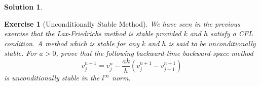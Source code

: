 \documentclass[10pt,letterpaper]{article}
\newcommand{\rb}[1]{ \left(  {#1} \right) }
\newcommand{\frb}[1]{ \left(  {#1} \right) }
\theoremstyle{break}
\newtheorem{exercise}{Exercise}
\newtheorem{mysolution}{Solution}
\newenvironment{solution}{\begin{mysolution}}{\end{mysolution}}
\begin{document}
\begin{solution}
\end{solution}













\begin{exercise}[Unconditionally Stable Method]
	We have seen in the previous exercise that the Lax-Friedrichs
	method is stable provided $k$ and $h$ satisfy a CFL condition.
	A method which is stable for any $k$ and $h$ is said to be
	\textit{unconditionally stable}.
	For $a>0$, prove that the following backward-time backward-space method
	$$
		v_{j}^{n+1}=v_j^n-\frac{ak}{h}(v_{j}^{n+1}-v_{j-1}^{n+1})
	$$
	is unconditionally stable in the $l^\infty$ norm.
\end{exercise}
\end{document}
